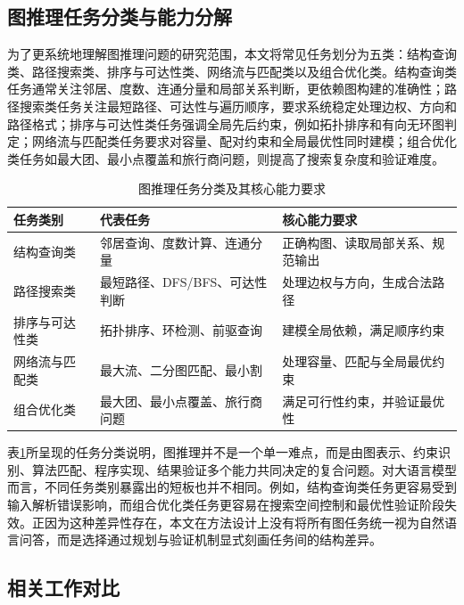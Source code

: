 \subsection{图推理任务分类与能力分解}

为了更系统地理解图推理问题的研究范围，本文将常见任务划分为五类：结构查询类、路径搜索类、排序与可达性类、网络流与匹配类以及组合优化类。结构查询类任务通常关注邻居、度数、连通分量和局部关系判断，更依赖图构建的准确性；路径搜索类任务关注最短路径、可达性与遍历顺序，要求系统稳定处理边权、方向和路径格式；排序与可达性类任务强调全局先后约束，例如拓扑排序和有向无环图判定；网络流与匹配类任务要求对容量、配对约束和全局最优性同时建模；组合优化类任务如最大团、最小点覆盖和旅行商问题，则提高了搜索复杂度和验证难度。

\begin{table}[htbp]
\centering
\small
\caption{图推理任务分类及其核心能力要求}
\label{tab:task_taxonomy}
\renewcommand{\arraystretch}{1.15}
\begin{tabularx}{\textwidth}{
>{\raggedright\arraybackslash}p{2.9cm}
>{\raggedright\arraybackslash}X
>{\raggedright\arraybackslash}X}
\toprule
任务类别 & 代表任务 & 核心能力要求 \\
\midrule
结构查询类 & 邻居查询、度数计算、连通分量 & 正确构图、读取局部关系、规范输出 \\
路径搜索类 & 最短路径、DFS/BFS、可达性判断 & 处理边权与方向，生成合法路径 \\
排序与可达性类 & 拓扑排序、环检测、前驱查询 & 建模全局依赖，满足顺序约束 \\
网络流与匹配类 & 最大流、二分图匹配、最小割 & 处理容量、匹配与全局最优约束 \\
组合优化类 & 最大团、最小点覆盖、旅行商问题 & 满足可行性约束，并验证最优性 \\
\bottomrule
\end{tabularx}
\end{table}

表\ref{tab:task_taxonomy}所呈现的任务分类说明，图推理并不是一个单一难点，而是由图表示、约束识别、算法匹配、程序实现、结果验证多个能力共同决定的复合问题。对大语言模型而言，不同任务类别暴露出的短板也并不相同。例如，结构查询类任务更容易受到输入解析错误影响，而组合优化类任务更容易在搜索空间控制和最优性验证阶段失效。正因为这种差异性存在，本文在方法设计上没有将所有图任务统一视为自然语言问答，而是选择通过规划与验证机制显式刻画任务间的结构差异。

\subsection{相关工作对比}

